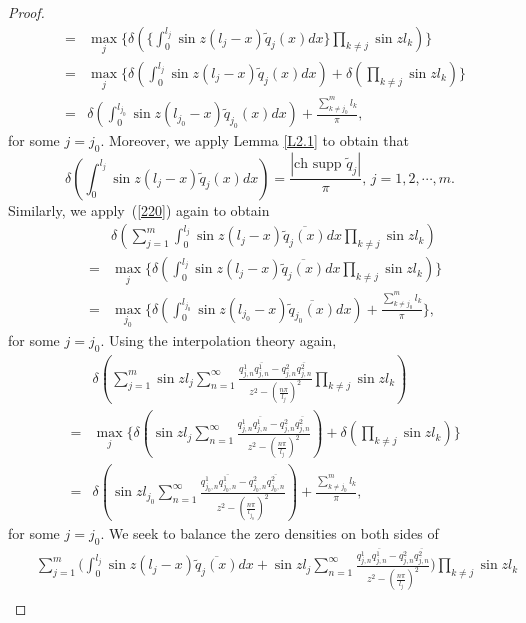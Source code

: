 \documentclass[10pt,a4paper]{article}
\theoremstyle{plain}
\theoremstyle{definition}
\theoremstyle{remark}
\numberwithin{equation}{section}
\begin{document}
\begin{proof}
\begin{eqnarray}
&=&\max_{j}\{\delta(\Big\{\int_{0}^{l_{j}}\sin{z(l_{j}-x)}\widetilde{q}_{j}(x)dx\Big\}\prod_{k\neq j}\sin{z l_{k}})\}\\&=&\max_{j}\{\delta(\int_{0}^{l_{j}}\sin{z(l_{j}-x)}\widetilde{q}_{j}(x)dx)+\delta(\prod_{k\neq j}\sin{z l_{k}})\}\\
&=&\delta(\int_{0}^{l_{j_{0}}}\sin{z(l_{j_{0}}-x)}\widetilde{q}_{j_{0}}(x)dx)+\frac{\sum_{k\neq j_{0}}^{m}l_{k}}{\pi}\label{3.4},
\end{eqnarray}
for some $j=j_{0}$. Moreover, we apply Lemma \ref{L2.1} to obtain that
$$\delta(\int_{0}^{l_{j}}\sin{z(l_{j}-x)}\widetilde{q}_{j}(x)dx)=\frac{|\mbox{ch supp } \widetilde{q}_{j}|}{\pi},\,j=1,2,\cdots,m.$$
Similarly, we apply~(\ref{220}) again to obtain
\begin{eqnarray}\nonumber
&&\delta(\sum_{j=1}^{m}\int_{0}^{l_{j}}\sin{z(l_{j}-x)}\overline{\widetilde{q}_{j}(x)}dx\prod_{k\neq j}\sin{z l_{k}})\\
&=&\max_{j}\{\delta(\int_{0}^{l_{j}}\sin{z(l_{j}-x)}\overline{\widetilde{q}_{j}(x)}dx\prod_{k\neq j}\sin{z l_{k}})\}\\
&=&\max_{j_{0}}\{\delta(\int_{0}^{l_{j_{0}}}\sin{z(l_{j_{0}}-x)}\overline{\widetilde{q}_{j_{0}}(x)}dx)+\frac{\sum_{k\neq j_{0}}^{m}l_{k}}{\pi}\},\label{3.6}
\end{eqnarray}
for some $j=j_{0}$.  %
Using the interpolation theory again,
\begin{eqnarray}\nonumber
&&\delta(\sum_{j=1}^{m}\sin{z l_{j}}\sum_{n=1}^{\infty}\frac{q^{1}_{j,n}\overline{q^{1}_{j,n}}-q^{2}_{j,n}\overline{q^{2}_{j,n}}}{z^{2}-(\frac{n\pi}{l_{j}})^{2}}\prod_{k\neq j}\sin{z l_{k}})\\
&=&\max_{j}\{\delta(\sin{z l_{j}}\sum_{n=1}^{\infty}\frac{q^{1}_{j,n}\overline{q^{1}_{j,n}}-q^{2}_{j,n}\overline{q^{2}_{j,n}}}{z^{2}-(\frac{n\pi}{l_{j}})^{2}})+\delta(\prod_{k\neq j}\sin{z l_{k}})\}\\
&=&\delta(\sin{z l_{j_{0}}}\sum_{n=1}^{\infty}\frac{q^{1}_{j_{0},n}\overline{q^{1}_{j_{0},n}}-q^{2}_{j_{0},n}\overline{q^{2}_{j_{0},n}}}{z^{2}-(\frac{n\pi}{l_{j_{0}}})^{2}})+\frac{\sum_{k\neq j_{0}}^{m}l_{k}}{\pi},\label{3.7}
\end{eqnarray}
for some $j=j_{0}$. We seek to balance the zero densities on both sides of 
\begin{eqnarray}\nonumber
&&\sum_{j=1}^{m}\Big(\int_{0}^{l_{j}}\sin{z(l_{j}-x)}\overline{\widetilde{q}_{j}(x)}dx+\sin{z l_{j}}\sum_{n=1}^{\infty}\frac{q^{1}_{j,n}\overline{q^{1}_{j,n}}-q^{2}_{j,n}\overline{q^{2}_{j,n}}}{z^{2}-(\frac{n\pi}{l_{j}})^{2}}\Big)\prod_{k\neq j}\sin{z l_{k}}\\

\end{eqnarray}
\end{proof}
\end{document}
